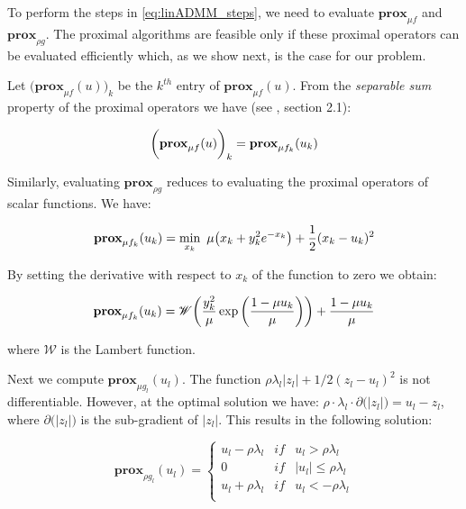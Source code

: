 \documentclass[review]{elsarticle}
\begin{document}
To perform the steps in \ref{eq:linADMM_steps}, we need to evaluate $\textbf{prox}_{\mu f}$ and $\textbf{prox}_{\rho g}$. The proximal algorithms are feasible only if these proximal operators can be evaluated efficiently which, as we show next, is the case for our problem. 

Let $\big(\textbf{prox}_{\mu f}(u)\big)_k$ be the $k^{th}$ entry of $\textbf{prox}_{\mu f}(u)$. From the \textit{separable sum} property of the proximal operators we have (see \cite{parikh_proximal_2014}, section 2.1):

\begin{equation}
\bigg(\textbf{prox}_{\mu f}(u)\bigg)_k = \textbf{prox}_{\mu f_k}(u_k)\\
\label{eq:linADMM_sepSum}
\end{equation}

Similarly, evaluating $\textbf{prox}_{\rho g}$ reduces to evaluating the proximal operators of scalar functions. We have:

\begin{equation}
\textbf{prox}_{\mu f_k}(u_k)=\min_{x_k} \,\, \mu\big(x_k+y_{k}^2e^{-x_{k}}\big)+\frac{1}{2}  (x_k-u_k)^2\\
\label{eq:linADMM_proxf}
\end{equation}

By setting the derivative with respect to $x_k$ of the function to zero we obtain:

\begin{equation}
\textbf{prox}_{\mu f_k}(u_k)=\mathscr{W}\bigg(\frac{y_k^2}{\mu} \exp\bigg(\frac{1-\mu u_k}{\mu}\bigg) \bigg) + \frac{1-\mu u_k}{\mu}\\
\label{eq:linADMM_proxf_sol}
\end{equation}

\noindent where $\mathscr{W}$ is the Lambert function.

Next we compute $\textbf{prox}_{\mu g_l}(u_l)$. The function $\rho \lambda_l |z_l|+1/2(z_l-u_l)^2$ is not differentiable. However, at the optimal solution we have: $\rho \cdot \lambda_l \cdot \partial \big(|z_l| \big)=u_l-z_l$, where $\partial \big(|z_l| \big)$ is the sub-gradient of $|z_l|$. This results in the following solution:

\begin{equation}
\textbf{prox}_{\rho g_l}(u_l)=\left\{\begin{matrix}
 u_l-\rho \lambda_l  & if &  u_l>\rho \lambda_l\\ 
 0  \,\,\,\,\,  & if &  |u_l|\le \rho \lambda_l\\ 
 u_l+\rho \lambda_l  &  if &  u_l<-\rho \lambda_l\\ 

\end{matrix}\right.
\label{eq:linADMM_proxg_sol}
\end{equation}
\end{document}
